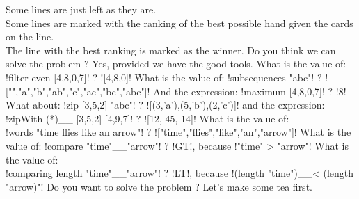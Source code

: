 \lhleft Some lines are just left as they are. \\
Some lines are marked with the ranking of the best possible hand given the cards on the line.\\
The line with the best ranking is marked as the winner.
\lhnext Do you think we can solve the problem ?
\lhleft Yes, provided we have the good tools.
\lhnext What is the value of:  \il!filter even [4,8,0,7]! ?
\lhleft \il![4,8,0]!
\lhnext What is the value of:  \il!subsequences "abc"! ?
\lhleft \il!["","a","b","ab","c","ac","bc","abc"]!
\lhnext And the expression: \il!maximum [4,8,0,7]! ? 
\lhleft \il!8!
\lhnext What about: \il!zip [3,5,2] "abc"! ?
\lhleft \il![(3,'a'),(5,'b'),(2,'c')]!
\lhnext and  the expression: \il!zipWith (*)__ [3,5,2] [4,9,7]! ?
\lhleft \il![12, 45, 14]!
\lhnext What is the value of: \\ \il!words "time flies like an arrow"! ?
\lhleft \il!["time","flies","like","an","arrow"]!
\lhnext What is the value of: \il!compare "time"__"arrow"! ?
\lhleft \il!GT!, because \il!"time" > "arrow"!
\lhnext What is the value of:\\ \il!comparing length "time"__"arrow"! ?
\lhleft \il!LT!, because \il!(length "time")__< (length "arrow)"!
\lhnext Do you want to solve the problem ? 
\lhleft Let's make some tea first.
\lhend








